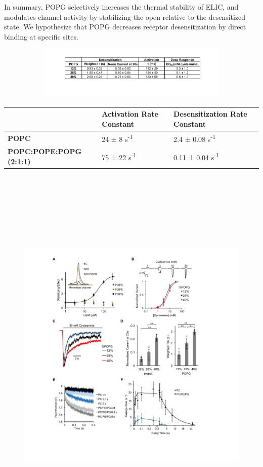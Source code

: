 In summary, POPG selectively increases the thermal stability of ELIC,
and modulates channel activity by stabilizing the open relative to the
desensitized state. We hypothesize that POPG decreases receptor
desensitization by direct binding at specific sites.

\begin{figure}
\includegraphics[width=5.93125in,height=0.99927in]{./pandoc_test/media/image3.pdf}
\end{figure}
\begin{longtable}[]{@{}lll@{}}
\toprule
& \textbf{Activation Rate Constant} & \textbf{Desensitization Rate
Constant}\tabularnewline
\midrule
\endhead
\textbf{POPC} & 24 ± 8 s\textsuperscript{-1} & 2.4 ± 0.08
s\textsuperscript{-1}\tabularnewline
\textbf{POPC:POPE:POPG (2:1:1)} & 75 ± 22 s\textsuperscript{-1} & 0.11 ±
0.04 s\textsuperscript{-1}\tabularnewline
\bottomrule
\end{longtable}
\begin{figure}
\includegraphics[width=6.11004in,height=7.37778in]{./pandoc_test/media/image4.pdf}
\end{figure}
